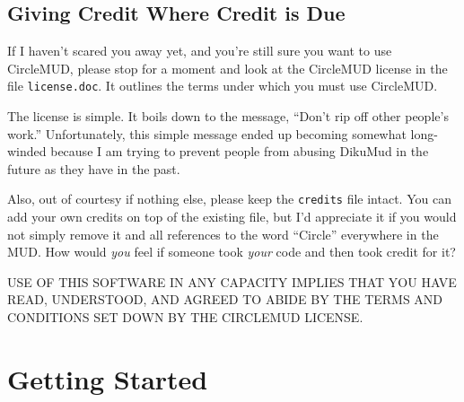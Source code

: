 \documentclass[11pt]{article}
\begin{document}
\subsection{Giving Credit Where Credit is Due}
If I haven't scared you away yet, and you're still sure you want to use CircleMUD, please stop for a moment and look at the CircleMUD license in the file \texttt{license.doc}.  It outlines the terms under which you must use CircleMUD.
\par
The license is simple.  It boils down to the message, ``Don't rip off other people's work.''  Unfortunately, this simple message ended up becoming somewhat long-winded because I am trying to prevent people from abusing DikuMud in the future as they have in the past. 
\par
Also, out of courtesy if nothing else, please keep the \texttt{credits} file intact.  You can add your own credits on top of the existing file, but I'd appreciate it if you would not simply remove it and all references to the word ``Circle'' everywhere in the MUD.  How would {\em you} feel if  someone took {\em your} code and then took credit for it?
\par
USE OF THIS SOFTWARE IN ANY CAPACITY IMPLIES THAT YOU HAVE READ, UNDERSTOOD, AND AGREED TO ABIDE BY THE TERMS AND CONDITIONS SET DOWN BY THE CIRCLEMUD LICENSE. 

\section{Getting Started}
\end{document}
